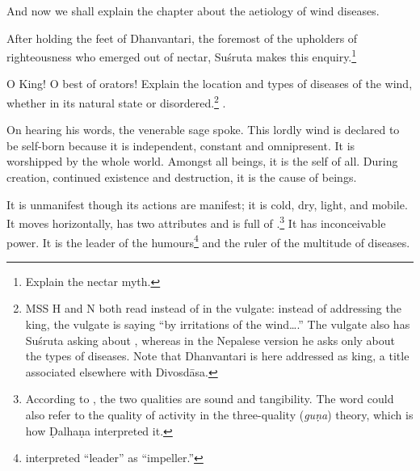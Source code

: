 \begin{translation}

\item [1] And now we shall explain the chapter about the aetiology of 
wind diseases.



\item[3] After holding the feet of Dhanvantari, the foremost of the upholders of 
righteousness who emerged out of nectar, Suśruta makes this 
enquiry.\footnote{Explain the nectar myth.}

\item[4] 

O King! O best of orators! Explain the location and types of diseases
of the wind, whether in its natural state or disordered.\footnote{MSS H and N 
both read  instead of  in the vulgate:  instead of 
addressing the king, the vulgate is saying “by irritations of the wind\ldots.”  
The vulgate also has Suśruta asking about , whereas in the 
Nepalese version he asks only about the types of diseases. Note that 
Dhanvantari is here addressed as king, a title associated elsewhere with 
Divosdāsa.}
.

\item[5--9] On hearing his words, the venerable sage spoke.  This
lordly wind is declared to be self-born because it is independent,
constant and omnipresent. It is worshipped by the whole world.  
Amongst all beings, it is the self of all. During creation, continued existence 
and destruction, it is the cause of beings. 

It is unmanifest though its actions are manifest; it is cold, dry,
light, and mobile.  It moves horizontally, has two attributes and is
full of .\footnote{According to ,
    the two qualities are sound and tangibility.  The word 
    could also refer to the quality of activity in the three-quality
    (\emph{guṇa}) theory, which is how Ḍalhaṇa interpreted it.}
%    
%
It has inconceivable power. It is the leader of the
humours\footnote{ interpreted  “leader”
    as  “impeller.”} and the ruler of the multitude of
    diseases.
    

\end{translation}
